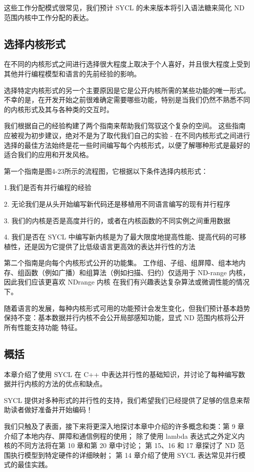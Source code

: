 这些工作分配模式很常见，我们预计 SYCL 的未来版本将引入语法糖来简化 ND 范围内核中工作分配的表达。

\subsection{选择内核形式}
在不同的内核形式之间进行选择很大程度上取决于个人喜好，并且很大程度上受到其他并行编程模型和语言的先前经验的影响。

选择特定内核形式的另一个主要原因是它是公开内核所需的某些功能的唯一形式。 不幸的是，在开发开始之前很难确定需要哪些功能，特别是当我们仍然不熟悉不同的内核形式及其与各种类的交互时。

我们根据自己的经验构建了两个指南来帮助我们驾驭这个复杂的空间。 这些指南应被视为初步建议，绝对不是为了取代我们自己的实验 - 在不同内核形式之间进行选择的最佳方法始终是花一些时间编写每个内核形式，以便了解哪种形式是最好的 适合我们的应用和开发风格。

第一个指南是图4-23所示的流程图，它根据以下条件选择内核形式：

1.我们是否有并行编程的经验

2. 无论我们是从头开始编写新代码还是移植用不同语言编写的现有并行程序

3. 我们的内核是否是高度并行的，或者在内核函数的不同实例之间重用数据

4. 我们是否在 SYCL 中编写新内核是为了最大限度地提高性能、提高代码的可移植性，还是因为它提供了比低级语言更高效的表达并行性的方法

第二个指南是向每个内核形式公开的功能集。 工作组、子组、组屏障、组本地内存、组函数（例如广播）和组算法（例如扫描、归约）仅适用于 ND-range 内核，因此我们应该更喜欢 NDrange 内核 在我们有兴趣表达复杂算法或微调性能的情况下。

随着语言的发展，每种内核形式可用的功能预计会发生变化，但我们预计基本趋势保持不变：基本数据并行内核不会公开局部感知功能，显式 ND 范围内核将公开所有性能支持功能 特征。

\subsection{概括}
本章介绍了使用 SYCL 在 C++ 中表达并行性的基础知识，并讨论了每种编写数据并行内核的方法的优点和缺点。

SYCL 提供对多种形式的并行性的支持，我们希望我们已经提供了足够的信息来帮助读者做好准备并开始编码！

我们只触及了表面，接下来将更深入地探讨本章中介绍的许多概念和类：第 9 章介绍了本地内存、屏障和通信例程的使用； 除了使用 lambda 表达式之外定义内核的不同方法将在第 10 章和第 20 章中讨论； 第 15、16 和 17 章探讨了 ND 范围执行模型到特定硬件的详细映射； 第 14 章介绍了使用 SYCL 表达常见并行模式的最佳实践。